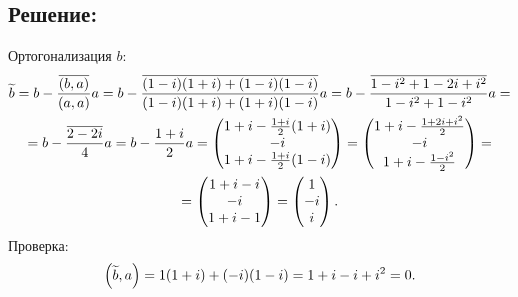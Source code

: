 \documentclass[12pt]{article}
\begin{document}
    \subsection*{Решение:}
    Ортогонализация $b$:
    \begin{multline*}
        \widetilde{b}
        = b - \frac{\overline{\left ( b, a \right )}}{\left ( a, a \right )} a
        = b - \frac{\overline{(1-i)(1+i) + (1-i)(1-i)}}{(1-i)(1+i) + (1+i)(1-i)} a
        = b - \frac{\overline{1 - i^2 + 1 - 2i + i^2}}{1 - i^2 + 1 - i^2} a = \\
        = b - \frac{\overline{2 - 2 i}}{4} a
        = b - \frac{1+i}{2} a
        = \begin{pmatrix}
              1 + i - \frac{1+i}{2} (1+i) \\
              -i                          \\
              1 + i - \frac{1+i}{2} (1-i)
        \end{pmatrix}
        = \begin{pmatrix}
              1 + i - \frac{1 + 2i + i^2}{2} \\
              -i                             \\
              1 + i - \frac{1 - i^2}{2}
        \end{pmatrix}
        = \\
        = \begin{pmatrix}
              1 + i - i \\
              -i        \\
              1 + i - 1
        \end{pmatrix}
        =
        \begin{pmatrix}
            1  \\
            -i \\
            i
        \end{pmatrix}
        .
    \end{multline*}
    Проверка:
    \[
        \left ( \widetilde{b}, a \right )
        = 1 ( 1 + i ) + (-i) ( 1 - i )
        = 1 + i - i + i^2
        = 0.
    \]
\end{document}
